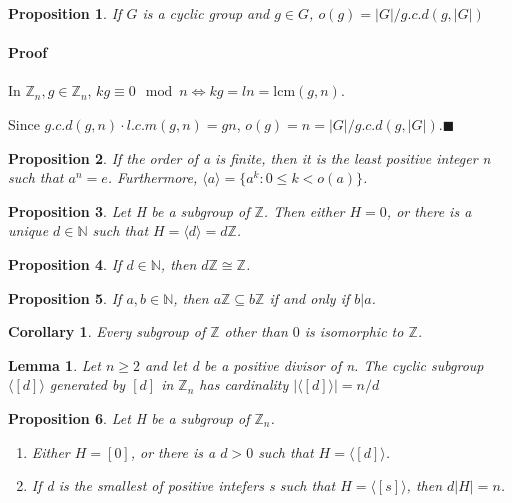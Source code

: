 \documentclass[12pt]{article}
\newtheorem{proposition}{Proposition}[subsection]
\newtheorem{lemma}{Lemma}[subsection]
\newtheorem{corollary}{Corollary}[subsection]
\begin{document}
    \begin{proposition}
    	If $G$ is a cyclic group and $g \in G$, $o(g) = |G|/g.c.d(g, |G|)$
    \end{proposition}
    	\paragraph{Proof}
    	In $\mathbb{Z}_n, g \in \mathbb{Z}_n$, $kg \equiv 0 \mod n \Leftrightarrow kg = ln = \mathrm{lcm}(g, n)$.
    	
    	Since $g.c.d(g, n)\cdot l.c.m(g, n) = gn$, $o(g) = n = |G|/g.c.d(g, |G|)$.$\blacksquare$

    \begin{proposition}
       If the order of a is finite, then it is the least positive integer n such that $a^n = e$. Furthermore, $\langle a \rangle = \{a^k: 0 \leq k < o(a)\}$.
    \end{proposition}
    \begin{proposition}
        Let H be a subgroup of $\mathbb{Z}$. Then either $H = {0}$, or there is a unique $d \in \mathbb{N}$ such that $H = \langle d \rangle = d\mathbb{Z}$.
    \end{proposition}
    \begin{proposition}
        If $d \in \mathbb{N}$, then $d\mathbb{Z} \cong \mathbb{Z}$.
    \end{proposition}
    \begin{proposition}
        If $a, b \in \mathbb{N}$, then $a\mathbb{Z} \subseteq b \mathbb{Z}$ if and only if $b | a$.
    \end{proposition}
    \begin{corollary}
        Every subgroup of $\mathbb{Z}$ other than ${0}$ is isomorphic to $\mathbb{Z}$.
    \end{corollary}
    \begin{lemma}
        Let $n \geq 2$ and let d be a positive divisor of n. The cyclic subgroup $\langle [d] \rangle$ generated by $[d]$ in $\mathbb{Z}_n$ has cardinality $|\langle [d] \rangle | = n/d$
    \end{lemma}
    \begin{proposition}
        Let H be a subgroup of $\mathbb{Z}_n$.
        \begin{enumerate}
            \item Either $H = {[0]}$, or there is a $d > 0$ such that $H = \langle [d] \rangle$.
            \item If d is the smallest of positive intefers s such that $H = \langle [s] \rangle$, then $d|H| = n$.
        \end{enumerate}

    \end{proposition}
\end{document}
